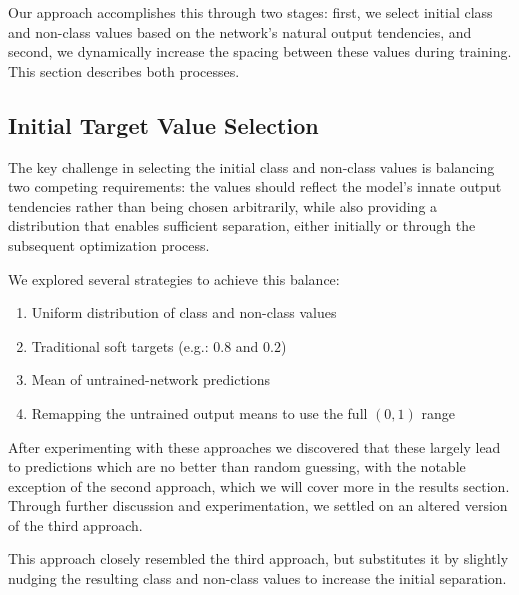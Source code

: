 \documentclass[12pt,fleqn,a4paper]{article}
\begin{document}
Our approach accomplishes this through two stages: first, we select initial class and non-class values based on the network's natural output tendencies, and second, we dynamically increase the spacing between these values during training. This section describes both processes.

\subsection{Initial Target Value Selection}
The key challenge in selecting the initial class and non-class values is balancing two competing requirements: the values should reflect the model's innate output tendencies rather than being chosen arbitrarily, while also providing a distribution that enables sufficient separation, either initially or through the subsequent optimization process.

We explored several strategies to achieve this balance:
\begin{enumerate}
    \item Uniform distribution of class and non-class values
    \item Traditional soft targets (e.g.: $0.8$ and $0.2$)
    \item Mean of untrained-network predictions
    \item Remapping the untrained output means to use the full $(0,1)$ range
\end{enumerate}

After experimenting with these approaches we discovered that these largely lead to predictions which are no better than random guessing, with the notable exception of the second approach, which we will cover more in the results section. Through further discussion and experimentation, we settled on an altered version of the third approach. 

\vspace{2em}
This approach closely resembled the third approach, but substitutes it by slightly nudging the resulting class and non-class values to increase the initial separation. 
\end{document}

